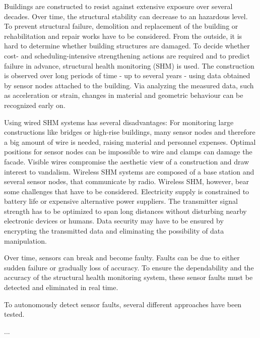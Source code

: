 \documentclass[12pt]{article}
\begin{document}
Buildings are constructed to resist against extensive exposure over several decades. 
Over time, the structural stability can decrease to an hazardous level. 
To prevent structural failure, demolition and replacement of the building or rehabilitation and repair works have to be considered.
From the outside, it is hard to determine whether building structures are damaged.
To decide whether cost- and scheduling-intensive strengthening actions are required and to predict failure in advance, structural health monitoring (SHM) is used. 
The construction is observed over long periods of time - up to several years - using data obtained by sensor nodes attached to the building.
Via analyzing the measured data, such as acceleration or strain, changes in material and geometric behaviour can be recognized early on.


Using wired SHM systems has several disadvantages: 
For monitoring large constructions like bridges or high-rise buildings, many sensor nodes and therefore a big amount of wire is needed, raising material and personnel expenses.
Optimal positions for sensor nodes can be impossible to wire and clamps can damage the facade. 
Visible wires compromise the aesthetic view of a construction and draw interest to vandalism.
Wireless SHM systems are composed of a base station and several sensor nodes, that communicate by radio.
Wireless SHM, however, bear some challenges that have to be considered. 
Electricity supply is constrained to battery life or expensive alternative power suppliers.
The transmitter signal strength has to be optimized to span long distances without disturbing nearby electronic devices or humans.
Data security may have to be ensured by encrypting the transmitted data and eliminating the possibility of data manipulation.

Over time, sensors can break and become faulty. Faults can be due to either sudden failure or gradually loss of accuracy.
To ensure the dependability and the accuracy of the structural health monitoring system, these sensor faults must be detected and eliminated in real time. 

To autonomously detect sensor faults, several different approaches have been tested.

...

\end{document}
